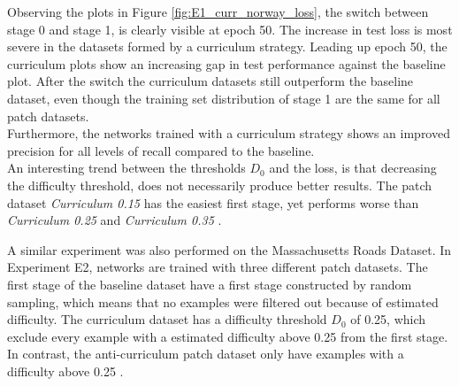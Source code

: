 Observing the plots in Figure \ref{fig:E1_curr_norway_loss}, the switch between stage 0 and stage 1, is clearly visible at epoch 50. The increase in test loss is most severe in the datasets formed by a curriculum strategy. Leading up epoch 50, the curriculum plots show an increasing gap in test performance against the baseline plot. After the switch the curriculum datasets still outperform the baseline dataset, even though the training set distribution of stage 1 are the same for all patch datasets.\\

Furthermore, the networks trained with a curriculum strategy shows an improved precision for all levels of recall compared to the baseline. \\

An interesting trend between the thresholds $D_0$ and the loss, is that decreasing the difficulty threshold, does not necessarily produce better results. The patch dataset \textit{Curriculum 0.15} has the easiest first stage, yet performs worse than \textit{Curriculum 0.25} and \textit{Curriculum 0.35} . \\



A similar experiment was also performed on the Massachusetts Roads Dataset. In Experiment E2, networks are trained with three different patch datasets. The first stage of the baseline dataset have a first stage constructed by random sampling, which means that no examples were filtered out because of estimated difficulty. The curriculum dataset has a difficulty threshold $D_0$ of 0.25, which exclude every example with a estimated difficulty above 0.25 from the first stage. In contrast, the anti-curriculum patch dataset only have examples with a difficulty above 0.25 .\\


